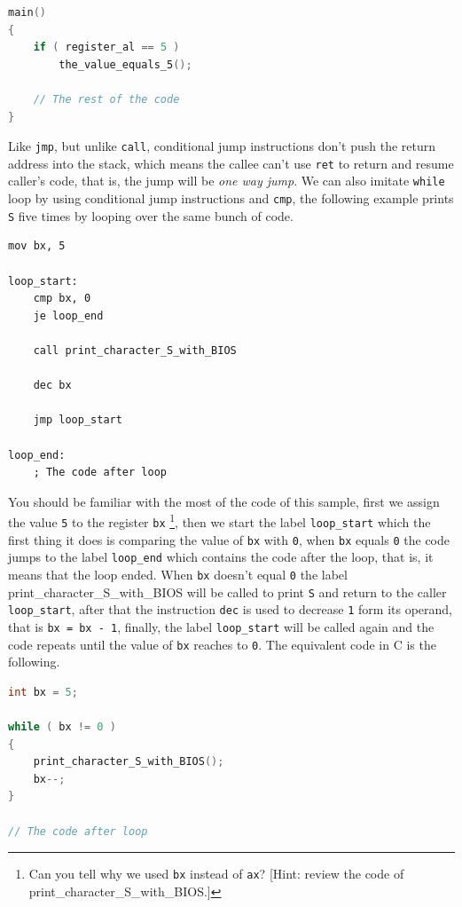 \begin{lstlisting}[language=C]
main() 
{
    if ( register_al == 5 )
        the_value_equals_5();

    // The rest of the code
}
\end{lstlisting}

Like \lstinline!jmp!, but unlike \lstinline!call!, conditional jump
instructions don't push the return address into the stack, which means
the callee can't use \lstinline!ret! to return and resume caller's code,
that is, the jump will be \emph{one way jump}. We can also imitate
\lstinline!while! loop by using conditional jump instructions and
\lstinline!cmp!, the following example prints \lstinline!S! five times
by looping over the same bunch of code.

\begin{lstlisting}
mov bx, 5

loop_start:
    cmp bx, 0
    je loop_end
    
    call print_character_S_with_BIOS
    
    dec bx
    
    jmp loop_start
    
loop_end:
    ; The code after loop
\end{lstlisting}

You should be familiar with the most of the code of this sample, first
we assign the value \lstinline!5! to the register \lstinline!bx!
\footnote{Can you tell why we used \lstinline!bx! instead of
  \lstinline!ax!? {[}Hint: review the code of
  print\_character\_S\_with\_BIOS.{]}}, then we start the label
\lstinline!loop_start! which the first thing it does is comparing the
value of \lstinline!bx! with \lstinline!0!, when \lstinline!bx! equals
\lstinline!0! the code jumps to the label \lstinline!loop_end! which
contains the code after the loop, that is, it means that the loop ended.
When \lstinline!bx! doesn't equal \lstinline!0! the label
print\_character\_S\_with\_BIOS will be called to print \lstinline!S!
and return to the caller \lstinline!loop_start!, after that the
instruction \lstinline!dec! is used to decrease \lstinline!1! form its
operand, that is \lstinline!bx = bx - 1!, finally, the label
\lstinline!loop_start! will be called again and the code repeats until
the value of \lstinline!bx! reaches to \lstinline!0!. The equivalent
code in C is the following.

\begin{lstlisting}[language=C]
int bx = 5;

while ( bx != 0 )
{
    print_character_S_with_BIOS();
    bx--;
}

// The code after loop
\end{lstlisting}

